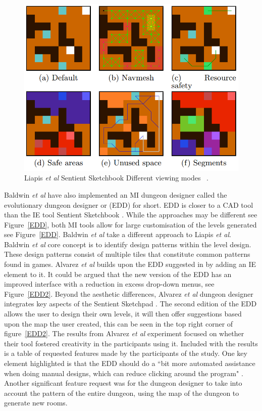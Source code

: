 \documentclass[journal]{IEEEtran}
\begin{document}
\begin{figure}[h]
	\includegraphics[width=1.0\linewidth]{SentientSketchbook2.PNG}
	\caption{Liapis \textit{et al} Sentient Sketchbook Different viewing modes ~\cite{liapis2013sentient}.}
	\label{Sketchbook2}
\end{figure} 

Baldwin \textit{et al} \cite{baldwin2017mixed} have also implemented an MI dungeon designer called the evolutionary dungeon designer or (EDD) for short. EDD is closer to a CAD tool than the IE tool Sentient Sketchbook \cite{liapis2013sentient}. While the approaches may be different see Figure~\ref{EDD}, both MI tools allow for large customisation of the levels generated see Figure~\ref{EDD}. Baldwin \textit{et al} \cite{baldwin2017mixed} take a different approach to Liapis \textit{et al}\cite{liapis2013sentient}. Baldwin \textit{et al} \cite{baldwin2017mixed} core concept is to identify design patterns within the level design. These design patterns consist of multiple tiles that constitute common patterns found in games. Alvarez \textit{et al}\cite{alvarez2018fostering} builds upon the EDD suggested in \cite{baldwin2017mixed} by adding an IE element to it. It could be argued that the new version of the EDD has an improved interface with a reduction in excess drop-down menus, see Figure~\ref{EDD2}. Beyond the aesthetic differences, Alvarez \textit{et al}\cite{alvarez2018fostering} dungeon designer integrates key aspects of the Sentient Sketchpad \cite{liapis2013sentient}. The second edition of the EDD allows the user to design their own levels, it will then offer suggestions based upon the map the user created, this can be seen in the top right corner of figure~\ref{EDD2}. The results from Alvarez \textit{et al}\cite{alvarez2018fostering} experiment focused on whether their tool fostered creativity in the participants using it. Included with the results is a table of requested features made by the participants of the study. One key element highlighted is that the EDD should do a ``bit more automated assistance when doing manual designs, which can reduce clicking around the program" \cite[Table 2]{alvarez2018fostering}. Another significant feature request was for the dungeon designer to take into account the pattern of the entire dungeon, using the map of the dungeon to generate new rooms.
\end{document}

